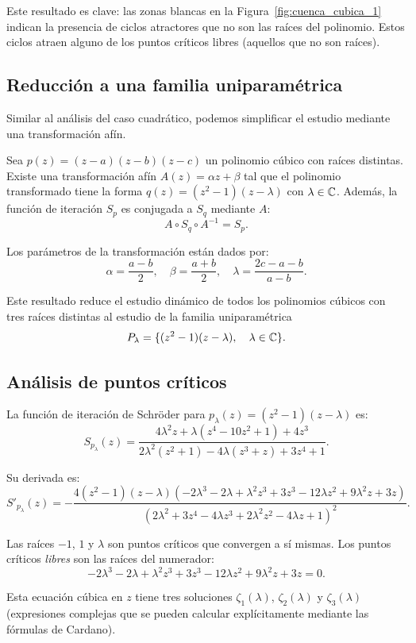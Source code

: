 Este resultado es clave: las zonas blancas en la Figura~\ref{fig:cuenca_cubica_1} indican la presencia de ciclos atractores que no son las raíces del polinomio. Estos ciclos atraen alguno de los puntos críticos libres (aquellos que no son raíces).

\subsection{Reducción a una familia uniparamétrica}

Similar al análisis del caso cuadrático, podemos simplificar el estudio mediante una transformación afín.

\begin{teorema}
Sea $p(z)=(z-a)(z-b)(z-c)$ un polinomio cúbico con raíces distintas. Existe una transformación afín $A(z)=\alpha z+\beta$ tal que el polinomio transformado tiene la forma $q(z)=(z^2-1)(z-\lambda)$ con $\lambda\in\mathbb{C}$. Además, la función de iteración $S_p$ es conjugada a $S_q$ mediante $A$:
$$
A\circ S_q\circ A^{-1}=S_p.
$$
\end{teorema}

Los parámetros de la transformación están dados por:
$$
\alpha=\frac{a-b}{2}, \quad \beta=\frac{a+b}{2}, \quad \lambda=\frac{2c-a-b}{a-b}.
$$

Este resultado reduce el estudio dinámico de todos los polinomios cúbicos con tres raíces distintas al estudio de la familia uniparamétrica
$$
P_\lambda=\{(z^2-1)(z-\lambda), \quad \lambda\in\mathbb{C}\}.
$$

\subsection{Análisis de puntos críticos}

La función de iteración de Schröder para $p_\lambda(z)=(z^2-1)(z-\lambda)$ es:
$$
S_{p_\lambda}(z)=\frac{4\lambda^2 z+\lambda(z^4-10z^2+1)+4z^3}{2\lambda^2(z^2+1)-4\lambda(z^3+z)+3z^4+1}.
$$

Su derivada es:
$$
S'_{p_\lambda}(z)=-\frac{4(z^2-1)(z-\lambda)(-2\lambda^3-2\lambda+\lambda^2 z^3+3z^3-12\lambda z^2+9\lambda^2 z+3z)}{(2\lambda^2+3z^4-4\lambda z^3+2\lambda^2 z^2-4\lambda z+1)^2}.
$$

Las raíces $-1$, $1$ y $\lambda$ son puntos críticos que convergen a sí mismas. Los puntos críticos \emph{libres} son las raíces del numerador:
$$
-2\lambda^3-2\lambda+\lambda^2 z^3+3z^3-12\lambda z^2+9\lambda^2 z+3z=0.
$$

Esta ecuación cúbica en $z$ tiene tres soluciones $\zeta_1(\lambda)$, $\zeta_2(\lambda)$ y $\zeta_3(\lambda)$ (expresiones complejas que se pueden calcular explícitamente mediante las fórmulas de Cardano).

